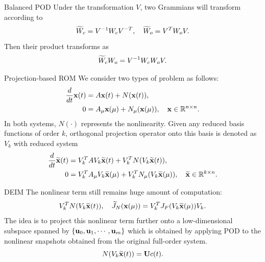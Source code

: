 \documentclass{beamer}
\begin{document}
\begin{frame}{Balanced POD}
	Under the transformation $V$, two Grammians will transform according to
	\begin{equation}
		\widetilde W_c = V^{-1}W_cV^{-T}, \quad \widetilde W_o = V^{T}W_oV.
	\end{equation}
	Then their product transforms as 
	\begin{equation}
		\widetilde W_cW_o = V^{-1}W_cW_oV.
	\end{equation}
\end{frame}

\begin{frame}{Projection-based ROM}
	We consider two types of problem as follows:
	\begin{equation}
		\begin{aligned}
			\frac{d}{dt}\mathbf{x}(t) & = A\mathbf{x}(t) + N(\mathbf{x}(t)),\\
			0 & = A_{\mu}\mathbf{x}(\mu) + N_{\mu}(\mathbf{x}(\mu)), \quad \mathbf{x} \in \mathbb{R}^{n\times n}.
		\end{aligned}
	\end{equation}
	In both systems, $N(\cdot)$ represents the nonlinearity. Given any reduced basis functions of order $k$, 
	orthogonal projection operator onto this basis is denoted as $V_k$ with reduced system
	\begin{equation}
		\begin{aligned}
			\frac{d}{dt}\widetilde{\mathbf{x}}(t) & = V_k^T A V_k\widetilde{\mathbf{x}}(t) + V_k^T N(V_k\widetilde{\mathbf{x}}(t)),\\
			0 & = V_k^T A_{\mu} V_k\widetilde{\mathbf{x}}(\mu) + V_k^T N_{\mu}(V_k\widetilde{\mathbf{x}}(\mu)), \quad \widetilde{\mathbf{x}} \in \mathbb{R}^{k\times n}.
		\end{aligned}
	\end{equation}
\end{frame}

\begin{frame}{DEIM}
	The nonlinear term still remains huge amount of computation:
	\begin{equation}
		V_k^T N(V_k\widetilde{\mathbf{x}}(t)), \quad \widetilde J_N(\mathbf{x}(\mu)) = V_k^T J_F(V_k\widetilde{\mathbf{x}}(\mu))V_k.
	\end{equation}
	The idea is to project this nonlinear term further onto a low-dimensional subspace spanned by $\left\{ \mathbf{u}_0, \mathbf{u}_1, \cdots, \mathbf{u}_m \right\}$
	which is obtained by applying POD to the nonlinear snapshots obtained from the original full-order system.
	\begin{equation}
		N(V_k\widetilde{\mathbf{x}}(t)) = \mathbf{U} c(t).
	\end{equation}
\end{frame}
\end{document}
